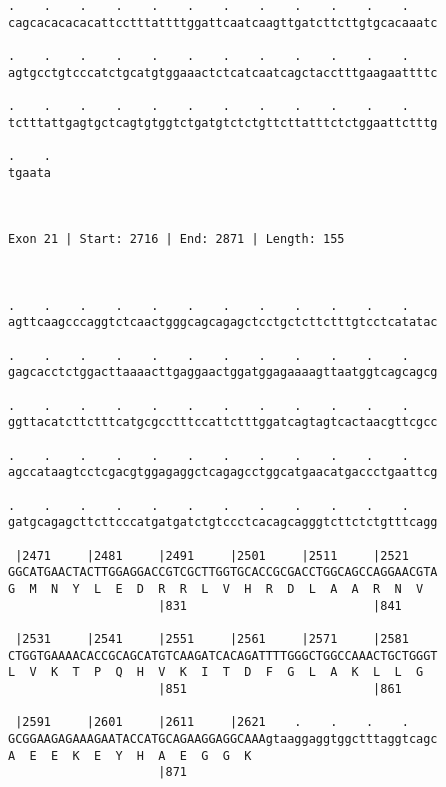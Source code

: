 \documentclass{article}
\begin{document}
\begin{Verbatim}
.    .    .    .    .    .    .    .    .    .    .    .    
cagcacacacacattcctttattttggattcaatcaagttgatcttcttgtgcacaaatc
                                                            
.    .    .    .    .    .    .    .    .    .    .    .    
agtgcctgtcccatctgcatgtggaaactctcatcaatcagctacctttgaagaattttc
                                                            
.    .    .    .    .    .    .    .    .    .    .    .    
tctttattgagtgctcagtgtggtctgatgtctctgttcttatttctctggaattctttg
                                                            
.    .
tgaata
      
      
 
Exon 21 | Start: 2716 | End: 2871 | Length: 155



.    .    .    .    .    .    .    .    .    .    .    .    
agttcaagcccaggtctcaactgggcagcagagctcctgctcttctttgtcctcatatac
                                                            
.    .    .    .    .    .    .    .    .    .    .    .    
gagcacctctggacttaaaacttgaggaactggatggagaaaagttaatggtcagcagcg
                                                            
.    .    .    .    .    .    .    .    .    .    .    .    
ggttacatcttctttcatgcgcctttccattctttggatcagtagtcactaacgttcgcc
                                                            
.    .    .    .    .    .    .    .    .    .    .    .    
agccataagtcctcgacgtggagaggctcagagcctggcatgaacatgaccctgaattcg
                                                            
.    .    .    .    .    .    .    .    .    .    .    .    
gatgcagagcttcttcccatgatgatctgtccctcacagcagggtcttctctgtttcagg
                                                            
 |2471     |2481     |2491     |2501     |2511     |2521    
GGCATGAACTACTTGGAGGACCGTCGCTTGGTGCACCGCGACCTGGCAGCCAGGAACGTA
G  M  N  Y  L  E  D  R  R  L  V  H  R  D  L  A  A  R  N  V  
                     |831                          |841     
  
 |2531     |2541     |2551     |2561     |2571     |2581    
CTGGTGAAAACACCGCAGCATGTCAAGATCACAGATTTTGGGCTGGCCAAACTGCTGGGT
L  V  K  T  P  Q  H  V  K  I  T  D  F  G  L  A  K  L  L  G  
                     |851                          |861     
  
 |2591     |2601     |2611     |2621    .    .    .    .    
GCGGAAGAGAAAGAATACCATGCAGAAGGAGGCAAAgtaaggaggtggctttaggtcagc
A  E  E  K  E  Y  H  A  E  G  G  K                          
                     |871                                   
  

\end{Verbatim}
\end{document}
